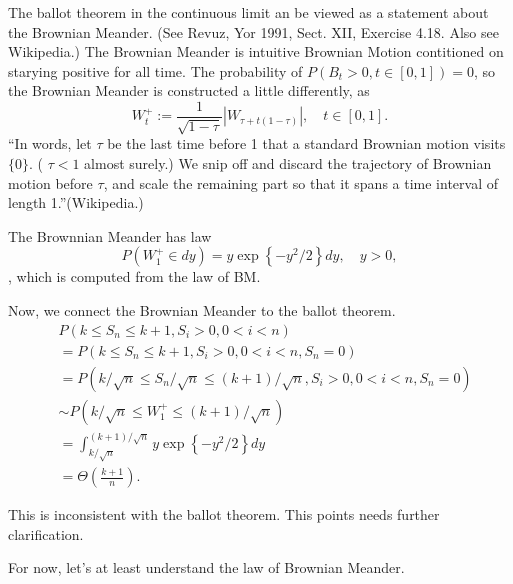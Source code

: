 \begin{tcolorbox}[title=Intuition of Ballot Theorem via Brownian Meander,colback=yellow!10,colframe=black,breakable]
The ballot theorem in the continuous limit an be viewed as a statement about the Brownian Meander. (See Revuz, Yor 1991, Sect. XII, Exercise 4.18. Also see Wikipedia.) The Brownian Meander is intuitive Brownian Motion contitioned on starying positive for all time. The probability of $P(B_t > 0, t \in [0,1]) = 0$, so the Brownian Meander is constructed a little differently, as
\[
W_t^{+}:=\frac{1}{\sqrt{1-\tau}}\left|W_{\tau+t(1-\tau)}\right|, \quad t \in[0,1] .
\]
``In words, let $\tau$ be the last time before 1 that a standard Brownian motion visits $\{0\}$. ( $\tau<1$ almost surely.) We snip off and discard the trajectory of Brownian motion before $\tau$, and scale the remaining part so that it spans a time interval of length 1.''(Wikipedia.)

The Brownnian Meander has law
\[
P\left(W_1^{+} \in d y\right)=y \exp \left\{-y^2 / 2\right\} d y, \quad y>0,
\]
, which is computed from the law of BM.

Now, we connect the Brownian Meander to the ballot theorem.
\begin{align*}
    &P\left(k \leq S_n \leq k+1, S_i>0,0<i<n\right) \\
    &=P\left(k \leq S_n \leq k+1, S_i>0,0<i<n, S_n=0\right)\\
    &=P\left(k/ \sqrt{n} \leq S_n / \sqrt{n} \leq (k+1) / \sqrt{n}, S_i>0,0<i<n, S_n=0\right)\\
    &\sim P\left(k/ \sqrt{n} \leq W_1^{+} \leq (k+1) / \sqrt{n}\right)\\
    &=\int_{k / \sqrt{n}}^{(k+1) / \sqrt{n}} y \exp \left\{-y^2 / 2\right\} d y\\
    &=\Theta\left(\frac{k+1}{n}\right) .
\end{align*}

This is{ \color{red} inconsistent} with the ballot theorem. This points needs further clarification. 

\end{tcolorbox}

For now, let's at least understand the law of Brownian Meander.

